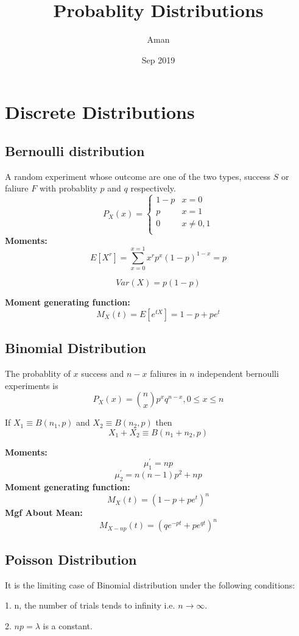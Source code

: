\documentclass{article}
\title{Probablity Distributions}
\author{Aman}
\date{Sep 2019}
\begin{document}
\maketitle

\section{Discrete Distributions}

\subsection{Bernoulli distribution}
A random experiment whose outcome are one of the two types, success $S$ or faliure $F$ with probablity $p$ and $q$ respectively.
$$ P_X(x)=    \left\{
\begin{array}{ll}
     1-p & x= 0 \\
      p & x= 1 \\
      0 & x\neq0,1 \\
\end{array} 
\right. $$
\textbf{Moments:} $$E[X^r]=\sum_{x=0}^{x=1}x^rp^x(1-p)^{1-x}=p$$

$$Var(X)=p(1-p)$$

\textbf{Moment generating function:}$$M_X(t)=E[e^{tX}]=1-p+pe^t$$


\subsection{Binomial Distribution}
The probablity of $x$ success and $n-x$ faliures in $n$ independent bernoulli experiments is 
$$
P_X(x)=\binom nxp^xq^{n-x}, 0\leq x\leq n
$$

If $X_1\equiv B(n_1,p)$ and $X_2 \equiv B(n_2,p)$ then 
$$
X_1+X_2 \equiv B(n_1+n_2,p)
$$  

\textbf{Moments:} $$\mu_1^\prime=np$$ $$\mu_2^\prime=n(n-1)p^2+np$$
\textbf{Moment generating function:}$$M_X(t)=(1-p+pe^t)^n$$
\textbf{Mgf About Mean:}$$M_{X-np}(t)=(qe^{-pt}+pe^{qt})^n$$


\subsection{Poisson Distribution}
It is the limiting case of Binomial distribution under the following conditions:

1. n, the number of trials tends to infinity i.e. $n \rightarrow \infty$.

2. $np = \lambda$ is a constant.
\end{document}
